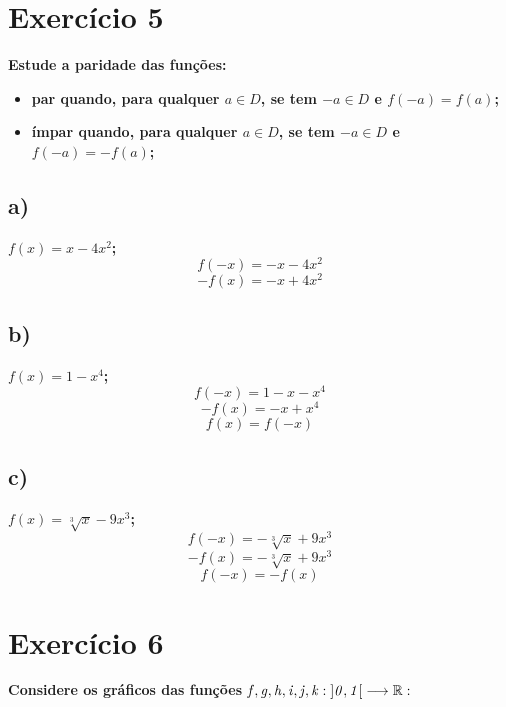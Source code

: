 \documentclass[a4paper]{article}
\begin{document}

\section*{Exercício 5}\textbf{Estude a paridade das funções:}
\begin{itemize}
	\item \textbf{ par quando, para qualquer $a \in D$, se tem $-a \in D$ e
	$f(-a)=f(a)$;}
	\item \textbf{ ímpar quando, para qualquer $a \in D$, se tem $-a \in D$ e
	$f(-a)=-f(a)$;}
	\end{itemize}
\subsection*{a)}
\textbf{$f(x)=x-4x^2$;}
\[f(-x)= -x - 4x^2\]
\[-f(x)= -x + 4x^2\]
\subsection*{b)}
\textbf{$f(x)=1-x^4$;}
\[f(-x)= 1-x - x^4\]
\[-f(x)= -x + x^4\]
\[f(x)=f(-x)\]
\subsection*{c)}
\textbf{$f(x)=\sqrt[3]{x}-9x^3$;}
\[f(-x)= -\sqrt[3]{x}+9x^3\]
\[-f(x)= -\sqrt[3]{x}+9x^3\]
\[f(-x)=-f(x)\]
\section*{Exercício 6} \textbf{Considere os gráficos das funções $\it{f},\it{g},\it{h},\it{i},\it{j},\it{k}: \left]0,1\right[\longrightarrow\mathbb{R}:$}
\end{document}
